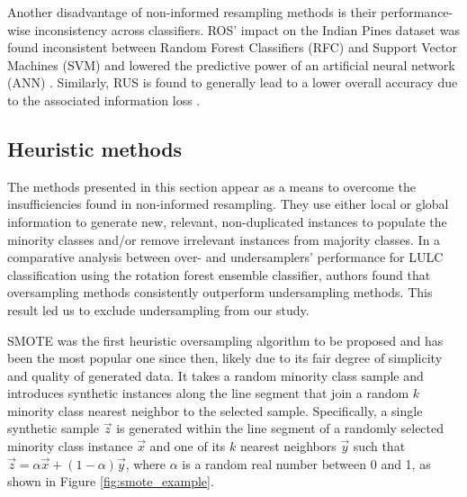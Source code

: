 Another disadvantage of non-informed resampling methods is their
performance-wise inconsistency across classifiers. ROS' impact on the Indian
Pines dataset was found inconsistent between Random Forest Classifiers (RFC)
and Support Vector Machines (SVM) and lowered the predictive power of an
artificial neural network (ANN) \cite{Maxwell2018}. Similarly, RUS is found to
generally lead to a lower overall accuracy due to the associated information
loss \cite{Maxwell2018}.

\subsection{Heuristic methods}

The methods presented in this section appear as a means to overcome the
insufficiencies found in non-informed resampling. They use either local or
global information to generate new, relevant, non-duplicated instances to
populate the minority classes and/or remove irrelevant instances from majority
classes. In a comparative analysis between over- and undersamplers' performance
for LULC classification \cite{Feng2018} using the rotation forest ensemble
classifier, authors found that oversampling methods consistently outperform
undersampling methods. This result led us to exclude undersampling from our
study.

SMOTE \cite{Chawla2002} was the first heuristic oversampling algorithm to be
proposed and has been the most popular one since then, likely due to its fair
degree of simplicity and quality of generated data. It takes a random minority
class sample and introduces synthetic instances along the line segment that
join a random $k$ minority class nearest neighbor to the selected sample.
Specifically, a single synthetic sample $\overrightarrow{z}$ is generated
within the line segment of a randomly selected minority class
instance $\overrightarrow{x}$ and one of its $k$ nearest
neighbors $\overrightarrow{y}$ such that $\overrightarrow{z} =
\alpha\overrightarrow{x}+(1-\alpha)\overrightarrow{y}$, where $\alpha$ is a
random real number between 0 and 1, as shown in
Figure \ref{fig:smote_example}.

